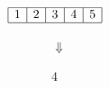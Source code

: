 \documentclass[varwidth]{standalone}
\begin{document}
$\begin{array}{|c|c|c|c|c|}
    \hline
    1 & 2 & 3 & 4 & 5 \\
    \hline
\end{array}$ \\ \\
$\qquad \quad\,\,\,\Downarrow$ \\ \\
$\qquad \quad\,\,\,4$
\end{document}
